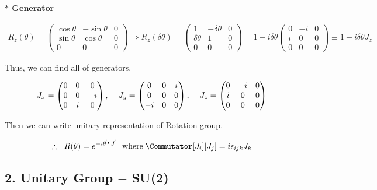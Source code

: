 \documentclass[11pt,letterpaper]{article}
\begin{document}
\textbf{$*$ Generator}

\begin{align}
 R_z(\theta) = 
 \begin{pmatrix}
 \cos\theta & -\sin\theta  & 0 \\
 \sin\theta & \cos\theta & 0  \\
  0 & 0 & 0
 \end{pmatrix}
 \Rightarrow
 R_z(\delta \theta) =
 \begin{pmatrix}
  1 & -\delta\theta & 0 \\
  \delta\theta & 1 & 0 \\
  0 & 0 & 0
 \end{pmatrix}
 = 1 - i\delta\theta
 \begin{pmatrix}
  0 & -i & 0 \\
  i & 0 & 0 \\
  0 & 0 & 0
 \end{pmatrix}
 \equiv 1 - i\delta\theta J_z
\end{align}

Thus, we can find all of generators.

\begin{align}
 J_x = 
 \begin{pmatrix}
  0 & 0 & 0 \\
  0 & 0 & -i \\
  0 & i & 0
 \end{pmatrix}
 \Com \HS J_y  = 
 \begin{pmatrix}
  0 & 0 & i \\
  0 & 0 & 0 \\
  -i & 0 & 0 \\
 \end{pmatrix}
 \Com \HS J_z =
 \begin{pmatrix}
  0 & -i & 0 \\
  i & 0 & 0 \\
  0 & 0 & 0
 \end{pmatrix}
\end{align}

Then we can write unitary representation of Rotation group.

\begin{align}
 \therefore \hs\hs R(\theta) = e^{-i\vec{\theta}\ld \vec{J}} \HS \text{where} \hs \Commutator[J_i][J_j] = i\eps_{ijk}J_k
\end{align}

\VS

\subsection*{2. Unitary Group $-$ SU(2)}
\end{document}
